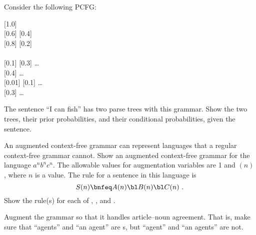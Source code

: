 \begin{uexercise}
Consider the following PCFG:
\begin{squote}
 \bnfeq {}  [1.0] \\
 \bnfeq {} [0.6] \bnfor {} [0.4] \\
 \bnfeq {}  [0.8] \bnfor {}  [0.2] \\
\\
 \bnfeq {} [0.1] \bnfor {} [0.3] \bnfor \ldots \\
 \bnfeq {} [0.4] \bnfor \ldots \\
 \bnfeq {} [0.01] \bnfor {} [0.1] \bnfor \ldots\\
 \bnfeq {} [0.3] \bnfor \ldots
\end{squote}
The sentence ``I can fish'' has two parse trees with this grammar. Show the two trees,
their prior probabilities, and their conditional probabilities, given the sentence.
\end{uexercise} 



\begin{exercise}
An augmented context-free grammar can represent languages that a
regular context-free grammar cannot. Show an augmented context-free
grammar for the language \(a^nb^nc^n\).  The allowable values for
augmentation variables are 1 and \((n)\), where \(n\) is
a value.  The rule for a sentence in this language is
\[
S(n) \bnfeq A(n) \bl B(n) \bl C(n) \ .
\]
Show the rule(s) for each of , , and .
\end{exercise} 


\begin{uexercise}
Augment the  grammar so that it handles article--noun
agreement. That is, make sure that ``agents'' and ``an agent'' are s, but
``agent'' and ``an agents'' are not.
\end{uexercise} 


